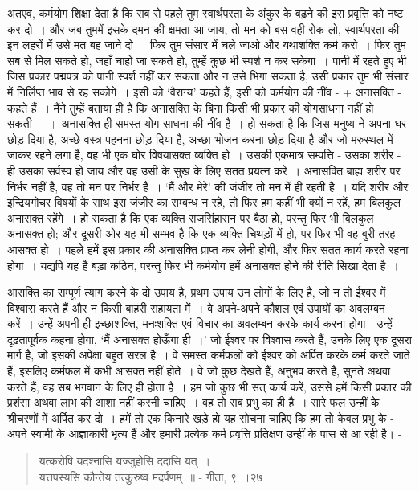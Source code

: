 अतएव, कर्मयोग शिक्षा देता है कि सब से पहले तुम स्वार्थपरता के अंकुर के बढ़ने की इस प्रवृत्ति को नष्ट कर दो~। और जब तुममें इसके दमन की क्षमता आ जाय, तो मन को बस वही रोक लो, स्वार्थपरता की इन लहरों में उसे मत बह जाने दो~। फिर तुम संसार में चले जाओ और यथाशक्ति कर्म करो~। फिर तुम सब से मिल सकते हो, जहाँ चाहो जा सकते हो, तुम्हें कुछ भी स्पर्श न कर सकेगा~। पानी में रहते हुए भी जिस प्रकार पद्मपत्र को पानी स्पर्श नहीं कर सकता और न उसे भिगा सकता है, उसी प्रकार तुम भी संसार में निर्लिप्त भाव से रह सकोगे~। इसी को ‘वैराग्य’ कहते हैं, इसी को कर्मयोग की नींव - + अनासक्ति - कहते हैं~। मैंने तुम्हें बताया ही है कि अनासक्ति के बिना किसी भी प्रकार की योगसाधना नहीं हो सकती~। + अनासक्ति ही समस्त योग-साधना की नींव है~। हो सकता है कि जिस मनुष्य ने अपना घर छोड़ दिया है, अच्छे वस्त्र पहनना छोड़ दिया है, अच्छा भोजन करना छोड़ दिया है और जो मरुस्थल में जाकर रहने लगा है, वह भी एक घोर विषयासक्त व्यक्ति हो~। उसकी एकमात्र सम्पत्ति - उसका शरीर - ही उसका सर्वस्व हो जाय और वह उसी के सुख के लिए सतत प्रयत्न करे~। अनासक्ति बाह्य शरीर पर निर्भर नहीं है, वह तो मन पर निर्भर है~। ‘मैं और मेरे’ की जंजीर तो मन में ही रहती है~। यदि शरीर और इन्द्रियगोचर विषयों के साथ इस जंजीर का सम्बन्ध न रहे, तो फिर हम कहीं भी क्यों न रहें, हम बिलकुल अनासक्त रहेंगे~। हो सकता है कि एक व्यक्ति राजसिंहासन पर बैठा हो, परन्तु फिर भी बिलकुल अनासक्त हो; और दूसरी ओर यह भी सम्भव है कि एक व्यक्ति चिथड़ों में हो, पर फिर भी वह बुरी तरह आसक्त हो~। पहले हमें इस प्रकार की अनासक्ति प्राप्त कर लेनी होगी, और फिर सतत कार्य करते रहना होगा~। यद्यपि यह है बड़ा कठिन, परन्तु फिर भी कर्मयोग हमें अनासक्त होने की रीति सिखा देता है~।

आसक्ति का सम्पूर्ण त्याग करने के दो उपाय है, प्रथम उपाय उन लोगों के लिए है, जो न तो ईश्वर में विश्वास करते हैं और न किसी बाहरी सहायता में~। वे अपने-अपने कौशल एवं उपायों का अवलम्बन करें~। उन्हें अपनी ही इच्छाशक्ति, मनःशक्ति एवं विचार का अवलम्बन करके कार्य करना होगा - उन्हें दृढ़तापूर्वक कहना होगा, ‘मैं अनासक्त होऊँगा ही~।’ जो ईश्वर पर विश्वास करते हैं, उनके लिए एक दूसरा मार्ग है, जो इसकी अपेक्षा बहुत सरल है~। वे समस्त कर्मफलों को ईश्वर को अर्पित करके कर्म करते जाते हैं, इसलिए कर्मफल में कभी आसक्त नहीं होते~। वे जो कुछ देखते हैं, अनुभव करते है, सुनते अथवा करते हैं, वह सब भगवान के लिए ही होता है~। हम जो कुछ भी सत् कार्य करें, उससे हमें किसी प्रकार की प्रशंसा अथवा लाभ की आशा नहीं करनी चाहिए~। वह तो सब प्रभु का ही है~। सारे फल उन्हीं के श्रीचरणों में अर्पित कर दो~। हमें तो एक किनारे खड़े हो यह सोचना चाहिए कि हम तो केवल प्रभु के - अपने स्वामी के आज्ञाकारी भृत्य हैं और हमारी प्रत्येक कर्म प्रवृत्ति प्रतिक्षण उन्हीं के पास से आ रही है। -

\begin{verse}
यत्करोषि यदश्नासि यज्जुहोसि ददासि यत्~।\\ यत्तपस्यसि कौन्तेय तत्कुरुष्व मदर्पणम्~॥ - गीता, ९~।२७
\end{verse}

